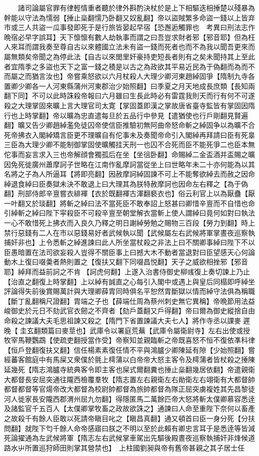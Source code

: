 　　諸司論屬官罪有律輕情重者聽於律外斟酌決杖於是上下相驅迭相捶楚以殘暴為幹能以守法為懦弱【捶止橤翻懦乃卧翻又奴亂翻】帝以盜賊繁多命盜一錢以上皆弃市或三人共盜一瓜事發即死于是行旅皆晏起早宿【恐邂逅觸罪也　考異曰刑法志作晩宿必早字誤耳】天下懔懔有數人劫執事而謂之曰吾豈求財者邪【邪音耶】但為枉人來耳而謂我奏至尊自古以來體國立法未有盜一錢而死者也而不為我以聞吾更來而屬無類矣帝聞之為停此法【自古以來閭里奸豪持吏短長者則有之矣未聞持其上至此者宜隋季之多盜也天下之富一錢之積是以古之為政欲其平易近民為于偽翻而為而不而屬之而猶言汝也】帝嘗乘怒欲以六月杖殺人大理少卿河東趙綽固爭【隋制九寺各置卿少卿各一人河東縣蒲州河東郡治少始照翻】曰季夏之月天地成長庶類【長知兩翻下同】不可以此時誅殺帝報曰六月雖曰生長此時必有雷霆我則天而行有何不可遂殺之大理掌固來曠上言大理官司太寛【掌固蓋即漢之掌故唐省臺寺監皆有掌固因隋行也上時掌翻】帝以曠為忠直遣每旦於五品行中參見【遣猶使也行戶剛翻見賢遍翻】曠又告少卿趙綽濫免徒囚帝使信臣推驗初無阿曲帝怒命斬之綽固争以為曠不合死帝拂衣入閣綽矯言臣更不理曠自有佗事未及奏聞帝命引入閣綽再拜請曰臣有死辠三臣為大理少卿不能制御掌固使曠觸挂天刑一也囚不合死而臣不能死爭二也臣本無佗事而妄言求入三也帝解顔會獨孤后在坐【坐徂卧翻】命賜綽二金盃酒并盃賜之曠因免死徙廣州蕭摩訶子世略在江南作亂摩訶當從坐上曰世略年未二十亦何能為以其名將之子為人所逼耳【將即亮翻】因赦摩訶綽固諫不可上不能奪欲綽去而赦之因命綽退食綽曰臣奏獄未決不敢退上曰大理其為朕特赦摩訶也因命左右釋之【為于偽翻】刑部侍郎辛亶嘗衣緋褌【衣於既翻褌古渾翻褻衣也】俗云利官上以為厭蠱【厭一叶翻又於琰翻】將斬之綽曰法不當死臣不敢奉詔上怒甚曰卿惜辛亶而不自惜也命引綽斬之綽曰陛下寜殺臣不可殺辛亶至朝堂解衣當斬上使人謂綽曰竟何如對曰執法一心不敢惜死上拂衣而入良久乃釋之明日謝綽勞勉之賜物三百段【勞力到翻】時上禁行惡錢有二人在市以惡錢易好者武候執以聞【武候屬左右武候將軍掌晝夜巡察執捕奸非也】上令悉斬之綽進諫曰此人所坐當杖殺之非法上曰不關卿事綽曰陛下不以臣愚暗置在法司欲妄殺人豈得不關臣事上曰撼大木不動者當退對曰臣望感天心何論動木上復曰啜羮者熱則置之【復扶又翻下同啜昌悦翻】天子之威欲相挫邪【邪音耶】綽拜而益前訶之不肯【訶虎何翻】上遂入治書侍御史柳彧復上奏切諫上乃止【治直之翻復上時掌翻】上以綽有誠直之心每引入閣中或遇上與皇后同榻即呼綽坐評論得失前後賞賜萬計與大理卿薛胄同時俱名平恕然胄斷獄以情而綽守法俱為稱職【斷丁亂翻稱尺證翻】胄端之子也【薛端仕周為蔡州刺史無它異稱】帝晩節用法益峻御史於元日不劾武官衣劒之不齊者【劾戶蓋翻又戶得翻】帝曰爾為御史縱捨自由命殺之諫議大夫毛思祖諫又殺之【隋門下省置諫議大夫七人】將作寺丞以課麥遲晚【圭玄翻類篇曰麥莖也】武庫令以署庭荒蕪【武庫令屬衛尉寺】左右出使或授牧宰馬鞭鸚鵡【使疏吏翻授當作受】帝察知並親臨斬之帝既喜怒不恒不復依凖科律【恒戶登翻復扶又翻】信任楊素素復任情不平與鴻臚少卿陳延有隙【少始照翻】嘗經蕃客館庭中有馬屎又衆僕於氈上樗蒲以白帝帝大怒主客令及樗蒲者皆杖殺之捶陳延幾死【隋志鴻臚寺統典客令即主客也屎式爾翻糞也捶止橤翻幾居依翻】帝遣親衛大都督長安屈突通往隴西檢覆羣牧【隋志置左右親衛左右勛衛左右翊衛有大都督帥都督都督等官煬帝改大都督為校尉帥都督為旅帥都督為隊正屈突虜複姓其先昌黎徒河人徙家長安隴西郡渭州屈九勿翻】得隱匿馬二萬餘匹帝大怒將斬太僕卿慕容悉逹及諸監官千五百人【太僕卿掌牧畜之政故欲誅之】通諫曰人命至重陛下奈何以畜產之故殺千有餘人臣敢以死請帝瞋目叱之【瞋昌真翻】通又頓首曰臣一身分死【分扶問翻】就陛下匄千餘人命帝感寤曰朕之不明以至於此賴有卿忠言耳于是悉逹等皆減死論擢通為左武候將軍【隋志左右武候掌車駕出先驅後殿晝夜巡察執捕奸非烽候道路水屮所置巡狩師田則掌其營禁也】　上柱國劉昶與帝有舊帝甚親之其子居士任